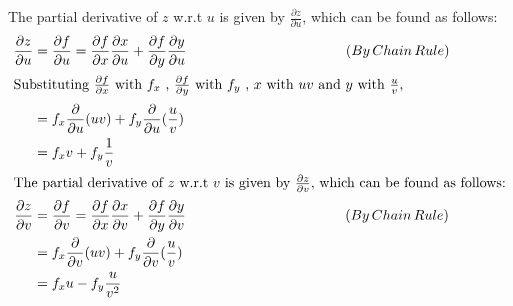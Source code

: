 \documentclass[solution,addpoints,12pt]{exam}
\begin{document}
\begin{questions}
\begin{parts}
\begin{solution}
            The partial derivative of $z$ w.r.t $u$ is given by $\frac{\partial z}{\partial u}$,  which can be found as follows:
            \begin{align*}
                \frac{\partial z }{\partial u} &= \frac{\partial f }{\partial u} = \frac{\partial f }{\partial x}\frac{\partial x }{\partial u} + \frac{\partial f }{\partial y}\frac{\partial y }{\partial u} \hspace*{40mm}(By\,Chain\,Rule)\\
                 \intertext{Substituting $\frac{\partial f }{\partial x}$ with $f_{x}$ , $\frac{\partial f }{\partial y}$ with $f_{y}$ , $x$ with $uv$ and $y$ with $\frac{u}{v}$,}
                &= f_{x} \frac{\partial}{\partial u}(uv) + f_{y} \frac{\partial}{\partial u}(\frac{u}{v})\\
                &= f_{x} v + f_{y} \frac{1}{v}\\
                \intertext{The partial derivative of $z$ w.r.t $v$ is given by $\frac{\partial z}{\partial v}$,  which can be found as follows:}
                \frac{\partial z }{\partial v} &= \frac{\partial f }{\partial v} = \frac{\partial f }{\partial x}\frac{\partial x }{\partial v} + \frac{\partial f }{\partial y}\frac{\partial y }{\partial v} \hspace*{40mm}(By\,Chain\,Rule)\\
                &= f_{x} \frac{\partial}{\partial v}(uv) + f_{y} \frac{\partial}{\partial v}(\frac{u}{v})\\
                &= f_{x} u - f_{y} \frac{u}{v^2}
            \end{align*}
        \end{solution}
            
    

\end{parts}
\end{questions}
\end{document}
